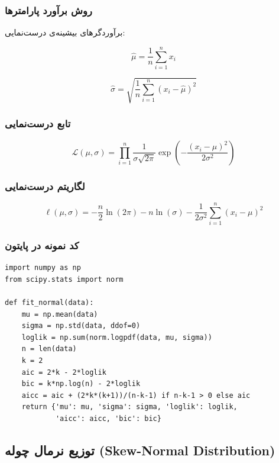 \documentclass[a4paper,12pt]{article}
\begin{document}
\subsubsection{روش برآورد پارامترها}

برآوردگرهای بیشینه‌ی درست‌نمایی:

\begin{equation}
\hat{\mu} = \frac{1}{n}\sum_{i=1}^{n} x_i
\end{equation}

\begin{equation}
\hat{\sigma} = \sqrt{\frac{1}{n}\sum_{i=1}^{n} (x_i - \hat{\mu})^2}
\end{equation}

\subsubsection{تابع درست‌نمایی}

\begin{equation}
\mathcal{L}(\mu, \sigma) = \prod_{i=1}^{n} \frac{1}{\sigma\sqrt{2\pi}} \exp\left(-\frac{(x_i-\mu)^2}{2\sigma^2}\right)
\end{equation}

\subsubsection{لگاریتم درست‌نمایی}

\begin{equation}
\ell(\mu, \sigma) = -\frac{n}{2}\ln(2\pi) - n\ln(\sigma) - \frac{1}{2\sigma^2}\sum_{i=1}^{n} (x_i - \mu)^2
\end{equation}

\subsubsection{کد نمونه در پایتون}

\begin{verbatim}
import numpy as np
from scipy.stats import norm

def fit_normal(data):
    mu = np.mean(data)
    sigma = np.std(data, ddof=0)
    loglik = np.sum(norm.logpdf(data, mu, sigma))
    n = len(data)
    k = 2
    aic = 2*k - 2*loglik
    bic = k*np.log(n) - 2*loglik
    aicc = aic + (2*k*(k+1))/(n-k-1) if n-k-1 > 0 else aic
    return {'mu': mu, 'sigma': sigma, 'loglik': loglik, 
            'aicc': aicc, 'bic': bic}
\end{verbatim}

\subsection{توزیع نرمال چوله (Skew-Normal Distribution)}
\end{document}

